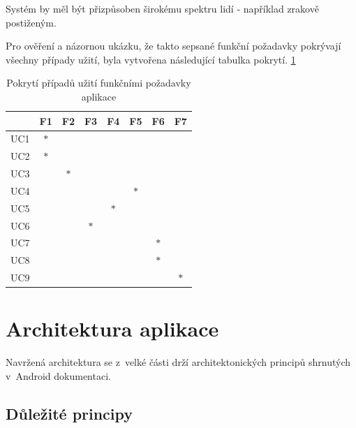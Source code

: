 Systém by měl být přizpůsoben širokému spektru lidí - například zrakově postiženým.


Pro ověření a názornou ukázku, že takto sepsané funkční požadavky pokrývají všechny případy užití, 
byla vytvořena následující tabulka pokrytí. \ref{table:tabulkaPokryti}

\begin{table}[H]
  \centering
  \begin{tabular}{|l|c|c|c|c|c|c|c|}
  \hline
       & F1     & F2     & F3     & F4     & F5     & F6     & F7  \\ \hline
  UC1  & $\ast$ &        &        &        &        &        &         \\ \hline
  UC2  & $\ast$ &        &        &        &        &        &         \\ \hline
  UC3  &        & $\ast$ &        &        &        &        &         \\ \hline
  UC4  &        &        &        &        & $\ast$ &        &         \\ \hline
  UC5  &        &        &        & $\ast$ &        &        &         \\ \hline
  UC6  &        &        & $\ast$ &        &        &        &         \\ \hline
  UC7  &        &        &        &        &        & $\ast$ &         \\ \hline
  UC8  &        &        &        &        &        & $\ast$ &         \\ \hline
  UC9  &        &        &        &        &        &        &  $\ast$ \\ \hline
  \end{tabular}
  \caption{Pokrytí případů užití funkčními požadavky aplikace}
  \label{table:tabulkaPokryti}
\end{table}
  

\section{Architektura aplikace}
Navržená architektura se z~velké části drží architektonických principů shrnutých v~Android dokumentaci.


\subsection*{Důležité principy}

